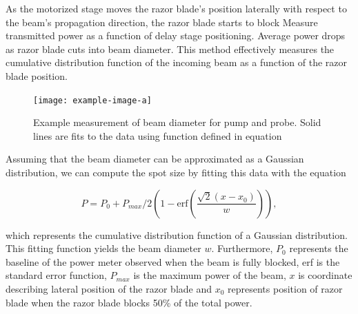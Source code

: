 As the motorized stage moves the razor blade's position laterally with respect to the beam's propagation direction, the razor blade starts to block Measure transmitted power as a function of delay stage positioning. Average power drops as razor blade cuts into beam diameter. This method effectively measures the cumulative distribution function of the incoming beam as a function of the razor blade position.

\begin{figure}[h]
	\centering
	\texttt{[image: example-image-a]}
	\caption{Example measurement of beam diameter for pump and probe. Solid lines are fits to the data using function defined in equation}
	\label{fig:beam_diamter_measurement}
\end{figure}

Assuming that the beam diameter can be approximated as a Gaussian distribution, we can compute the spot size by fitting this data with the equation 

\begin{equation}
	P = P_0 + P_{max}/2 \left( 1 - \mathrm{erf} \left( \dfrac{\sqrt{2}(x - x_0)}{w} \right) \right),
\end{equation}

which represents the cumulative distribution function of a Gaussian distribution. This fitting function yields the beam diameter $w$. Furthermore, $P_0$ represents the baseline of the power meter observed when the beam is fully blocked, erf is the standard error function, $P_{max}$ is the maximum power of the beam, $x$ is coordinate describing lateral position of the razor blade and $x_0$ represents position of razor blade when the razor blade blocks 50\% of the total power.  







